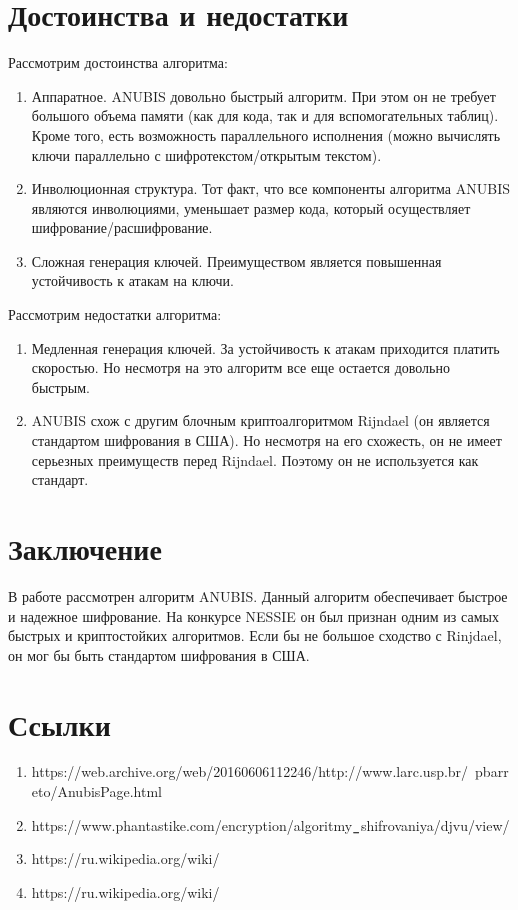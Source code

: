 \documentclass[12pt]{article}
\begin{document}
\section{Достоинства и недостатки}
Рассмотрим достоинства алгоритма:
\begin{enumerate}
    \item Аппаратное. ANUBIS довольно быстрый алгоритм. При этом он не требует большого объема памяти (как для кода, так и для вспомогательных таблиц). Кроме того, есть возможность параллельного исполнения (можно вычислять ключи параллельно с шифротекстом/открытым текстом).
    \item Инволюционная структура. Тот факт, что все компоненты алгоритма ANUBIS являются инволюциями, уменьшает размер кода, который осуществляет шифрование/расшифрование.
    \item Сложная генерация ключей. Преимуществом является повышенная устойчивость к атакам на ключи.
\end{enumerate}
\newline
Рассмотрим недостатки алгоритма:
\begin{enumerate}
    \item Медленная генерация ключей. За устойчивость к атакам приходится платить скоростью. Но несмотря на это алгоритм все еще остается довольно быстрым.
    \item ANUBIS схож с другим блочным криптоалгоритмом Rijndael (он является стандартом шифрования в США). Но несмотря на его схожесть, он не имеет серьезных преимуществ перед Rijndael. Поэтому он не используется как стандарт.
\end{enumerate}

\section{Заключение}
В работе рассмотрен алгоритм ANUBIS. Данный алгоритм обеспечивает быстрое и надежное шифрование. На конкурсе NESSIE он был признан одним из самых быстрых и криптостойких алгоритмов. Если бы не большое сходство с Rinjdael, он мог бы быть стандартом шифрования в США.

\section{Ссылки}
\begin{enumerate}
    \item https://web.archive.org/web/20160606112246/http://www.larc.usp.br/~pbarreto/AnubisPage.html
    \item 
    https://www.phantastike.com/encryption/algoritmy$\verb|_|$shifrovaniya/djvu/view/
    \item https://ru.wikipedia.org/wiki/%
    \item https://ru.wikipedia.org/wiki/%
\end{enumerate}
\end{document}

